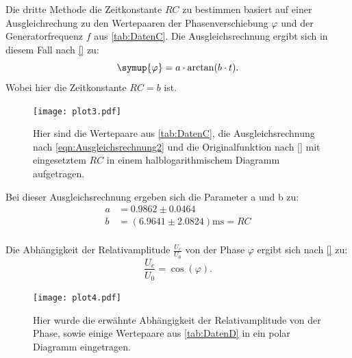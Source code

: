 Die dritte Methode die Zeitkonstante $RC$ zu bestimmen basiert auf einer Ausgleichrechung zu den Wertepaaren der Phasenverschiebung $\varphi$ 
und der Generatorfrequenz $f$ aus \autoref{tab:DatenC}.
Die Ausgleichsrechnung ergibt sich in diesem Fall nach \eqref{} zu:
\begin{equation}
  \label{eqn:Ausgleichsrechnung2}
  \symup{\varphi} = a\cdot\arctan(b\cdot t).
\end{equation}
Wobei hier die Zeitkonstante $RC = b$ ist.
\begin{figure}
  \centering
  \texttt{[image: plot3.pdf]}
  \caption{Hier sind die Wertepaare aus \autoref{tab:DatenC}, die Ausgleichsrechnung nach \eqref{eqn:Ausgleichsrechnung2} und die Originalfunktion nach \eqref{} mit eingesetztem $RC$ in einem halblogarithmischem Diagramm aufgetragen.}
  \label{fig:plot3}
\end{figure}
Bei dieser Ausgleichsrechnung ergeben sich die Parameter a und b zu:
\begin{align*}
  a &=0.9862\pm 0.0464 \\
  b &=(6.9641\pm 2.0824) \unit{\milli\second} = RC \\
\end{align*}

Die Abhängigkeit der Relativamplitude $\frac{U_c}{U_0}$ von der Phase $\varphi$ ergibt sich nach \eqref{} zu:
\begin{equation*}
  \frac{U_c}{U_0} = \cos\left(\varphi\right).
\end{equation*}

\begin{figure}
  \centering
  \texttt{[image: plot4.pdf]}
  \caption{Hier wurde die erwähnte Abhängigkeit der Relativamplitude von der Phase, sowie einige Wertepaare aus \autoref{tab:DatenD} in ein polar Diagramm eingetragen.}
  \label{fig:plot4}
\end{figure}

